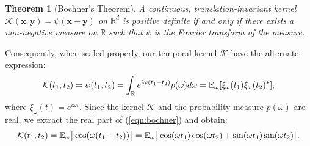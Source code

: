 \documentclass{article} %
\newcommand{\Kcal}{\mathcal{K}}
\newtheorem{theorem}{Theorem}
\begin{document}
\begin{theorem}[Bochner's Theorem]
A continuous, translation-invariant kernel $\mathcal{K}(\mathbf{x},\mathbf{y})=\psi(\mathbf{x}-\mathbf{y})$ on $\mathbb{R}^d$ is positive definite if and only if there exists a non-negative measure on $\mathbb{R}$ such that $\psi$ is the Fourier transform of the measure.
\end{theorem}
Consequently, when scaled properly, our temporal kernel $\Kcal$ have the alternate expression:
\begin{equation}
\label{eqn:bochner}
    \mathcal{K}(t_1, t_2) = \psi(t_1, t_2) = \int_{\mathbb{R}}e^{i\omega(t_1 - t_2)}p(\omega)d\omega = \mathbb{E}_{\omega}[\xi_{\omega}(t_1) \xi_{\omega}(t_2)^*],
\end{equation}
where $\xi_{\omega}(t) = e^{i\omega t}$. Since the kernel $\mathcal{K}$ and the probability measure $p(\omega)$ are real, we extract the real part of (\ref{eqn:bochner}) and obtain:
\begin{equation}
\label{eqn:bochner-mapping}
    \mathcal{K}(t_1,t_2) = \mathbb{E}_{\omega}\big[\cos(\omega (t_1 - t_2))\big]=\mathbb{E}_{\omega}\big[\cos(\omega t_1)\cos(\omega t_2) + \sin(\omega t_1)\sin(\omega t_2) \big].
\end{equation}
\end{document}
